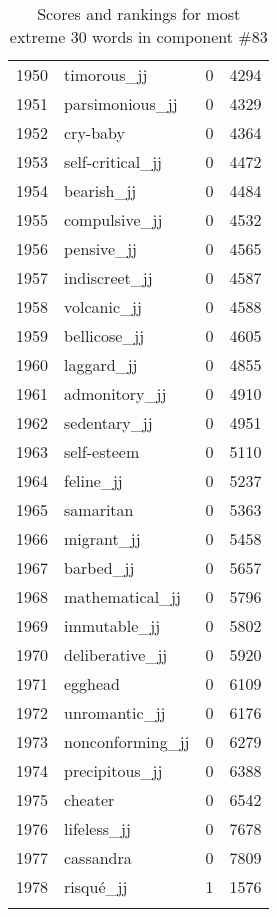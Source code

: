 \begin{longtable}[!htbp]{| rlr@{.}l |}
    1950 & timorous\_jj & 0 & 4294 \\
    1951 & parsimonious\_jj & 0 & 4329 \\
    1952 & cry-baby & 0 & 4364 \\
    1953 & self-critical\_jj & 0 & 4472 \\
    1954 & bearish\_jj & 0 & 4484 \\
    1955 & compulsive\_jj & 0 & 4532 \\
    1956 & pensive\_jj & 0 & 4565 \\
    1957 & indiscreet\_jj & 0 & 4587 \\
    1958 & volcanic\_jj & 0 & 4588 \\
    1959 & bellicose\_jj & 0 & 4605 \\
    1960 & laggard\_jj & 0 & 4855 \\
    1961 & admonitory\_jj & 0 & 4910 \\
    1962 & sedentary\_jj & 0 & 4951 \\
    1963 & self-esteem & 0 & 5110 \\
    1964 & feline\_jj & 0 & 5237 \\
    1965 & samaritan & 0 & 5363 \\
    1966 & migrant\_jj & 0 & 5458 \\
    1967 & barbed\_jj & 0 & 5657 \\
    1968 & mathematical\_jj & 0 & 5796 \\
    1969 & immutable\_jj & 0 & 5802 \\
    1970 & deliberative\_jj & 0 & 5920 \\
    1971 & egghead & 0 & 6109 \\
    1972 & unromantic\_jj & 0 & 6176 \\
    1973 & nonconforming\_jj & 0 & 6279 \\
    1974 & precipitous\_jj & 0 & 6388 \\
    1975 & cheater & 0 & 6542 \\
    1976 & lifeless\_jj & 0 & 7678 \\
    1977 & cassandra & 0 & 7809 \\
    1978 & risqué\_jj & 1 & 1576 \\
    \hline
    \caption{Scores and rankings for most extreme 30 words in component \#83} \\
\end{longtable}
